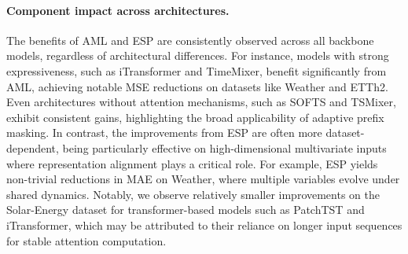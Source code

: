 \documentclass{article}
\begin{document}
\paragraph{Component impact across architectures.}
The benefits of AML and ESP are consistently observed across all backbone models, regardless of architectural differences. For instance, models with strong expressiveness, such as iTransformer and TimeMixer, benefit significantly from AML, achieving notable MSE reductions on datasets like Weather and ETTh2. Even architectures without attention mechanisms, such as SOFTS and TSMixer, exhibit consistent gains, highlighting the broad applicability of adaptive prefix masking. In contrast, the improvements from ESP are often more dataset-dependent, being particularly effective on high-dimensional multivariate inputs where representation alignment plays a critical role. For example, ESP yields non-trivial reductions in MAE on Weather, where multiple variables evolve under shared dynamics. Notably, we observe relatively smaller improvements on the Solar-Energy dataset for transformer-based models such as PatchTST and iTransformer, which may be attributed to their reliance on longer input sequences for stable attention computation.
\end{document}
